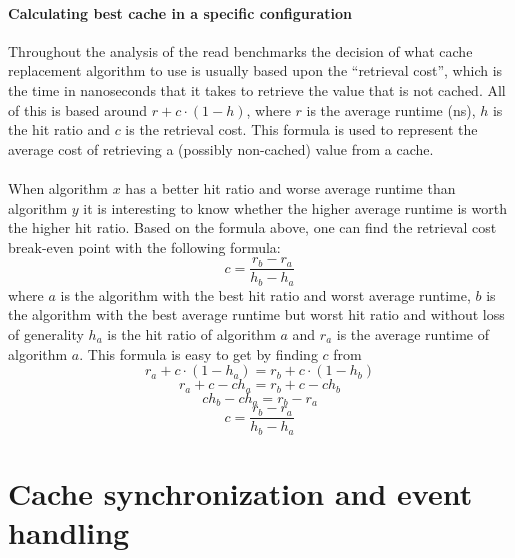 \documentclass[pdftex,a4paper,12pt,twoside]{report}
\begin{document}
\subsubsection{Calculating best cache in a specific configuration}
Throughout the analysis of the read benchmarks the decision of what cache replacement algorithm to use is usually based upon the ``retrieval cost'', which is the time in nanoseconds that it takes to retrieve the value that is not cached. All of this is based around $r + c \cdot (1 - h)$, where $r$ is the average runtime (ns), $h$ is the hit ratio and $c$ is the retrieval cost. This formula is used to represent the average cost of retrieving a (possibly non-cached) value from a cache.
\\\\
When algorithm $x$ has a better hit ratio and worse average runtime than algorithm $y$ it is interesting to know whether the higher average runtime is worth the higher hit ratio. Based on the formula above, one can find the retrieval cost break-even point with the following formula:
\[
c = \frac{r_b-r_a}{h_b-h_a}
\]
where $a$ is the algorithm with the best hit ratio and worst average runtime, $b$ is the algorithm with the best average runtime but worst hit ratio and without loss of generality $h_a$ is the hit ratio of algorithm $a$ and $r_a$ is the average runtime of algorithm $a$. This formula is easy to get by finding $c$ from 
\[
r_a + c \cdot (1 - h_a) = r_b + c \cdot (1 - h_b)
\]\[
r_a + c - ch_a = r_b + c - ch_b
\]\[
ch_b - ch_a = r_b - r_a
\]\[
c = \frac{r_b - r_a}{h_b - h_a}
\]
\chapter{Cache synchronization and event handling}
\end{document}
